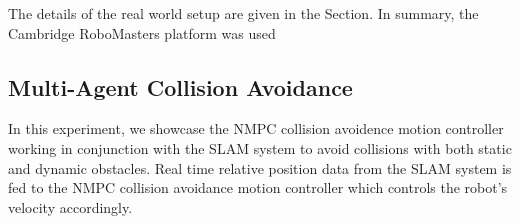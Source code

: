 The details of the real world setup are given in the  Section. In summary, the Cambridge RoboMasters platform was used

\subsection{Multi-Agent Collision Avoidance}
\label{sec:multi-agent-collision-avoidance}
In this experiment, we showcase the NMPC collision avoidence motion controller working in conjunction with the SLAM system to avoid collisions with both static and dynamic obstacles. Real time relative position data from the SLAM system is fed to the NMPC collision avoidance motion controller which controls the robot's velocity accordingly.



